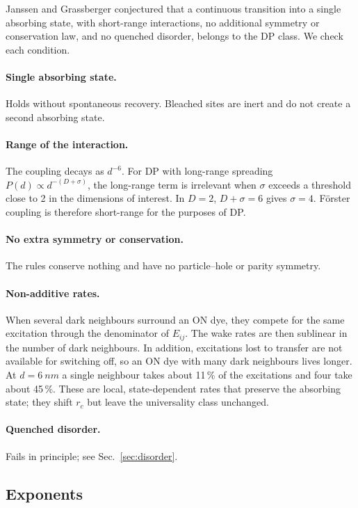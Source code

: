 \documentclass[11pt,a4paper]{article}
\begin{document}
Janssen and Grassberger conjectured that a continuous transition into a single
absorbing state, with short-range interactions, no additional symmetry or
conservation law, and no quenched disorder, belongs to the DP class. We check
each condition.

\paragraph{Single absorbing state.} Holds without spontaneous recovery.
Bleached sites are inert and do not create a second absorbing state.

\paragraph{Range of the interaction.} The coupling decays as $d^{-6}$. For DP
with long-range spreading $P(d)\propto d^{-(D+\sigma)}$, the long-range term is
irrelevant when $\sigma$ exceeds a threshold close to 2 in the dimensions of
interest. In $D=2$, $D+\sigma=6$ gives $\sigma=4$. F\"orster coupling is
therefore short-range for the purposes of DP.

\paragraph{No extra symmetry or conservation.} The rules conserve nothing and
have no particle--hole or parity symmetry.

\paragraph{Non-additive rates.} When several dark neighbours surround an ON dye,
they compete for the same excitation through the denominator of $E_{ij}$. The
wake rates are then sublinear in the number of dark neighbours. In addition,
excitations lost to transfer are not available for switching off, so an ON dye
with many dark neighbours lives longer. At $d=\SI{6}{nm}$ a single neighbour
takes about 11\,\% of the excitations and four take about 45\,\%. These are
local, state-dependent rates that preserve the absorbing state; they shift
$r_c$ but leave the universality class unchanged.

\paragraph{Quenched disorder.} Fails in principle; see Sec.~\ref{sec:disorder}.

\subsection{Exponents}
\end{document}
